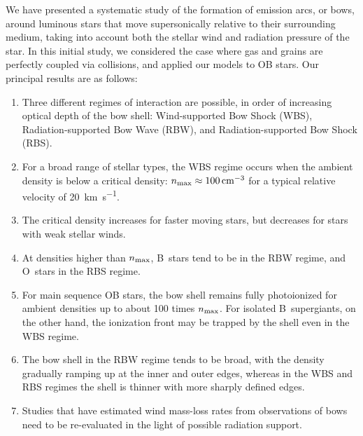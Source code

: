 We have presented a systematic study of the formation of emission
arcs, or bows, around luminous stars that move supersonically relative
to their surrounding medium, taking into account both the stellar wind
and radiation pressure of the star.  In this initial study, we
considered the case where gas and grains are perfectly coupled via
collisions, and applied our models to OB stars.  Our principal results
are as follows:
\begin{enumerate}[1.]
\item Three different regimes of interaction are possible, in order of
  increasing optical depth of the bow shell: Wind-supported Bow Shock
  (WBS), Radiation-supported Bow Wave (RBW), and Radiation-supported
  Bow Shock (RBS).
\item For a broad range of stellar types, the WBS regime occurs when
  the ambient density is below a critical density:
  \(n_{\text{max}} \approx \SI{100}{cm^{-3}}\) for a typical relative velocity of
  \SI{20}{km.s^{-1}}.
\item The critical density increases for faster moving stars, but
  decreases for stars with weak stellar winds.
\item At densities higher than \(n_{\text{max}}\), B~stars tend to be in the
  RBW regime, and O~stars in the RBS regime.
\item For main sequence OB stars, the bow shell remains fully
  photoionized for ambient densities up to about 100 times
  \(n_{\text{max}}\). For isolated B~supergiants, on the other hand, the
  ionization front may be trapped by the shell even in the WBS regime.
\item The bow shell in the RBW regime tends to be broad, with the
  density gradually ramping up at the inner and outer edges, whereas
  in the WBS and RBS regimes the shell is thinner with more sharply
  defined edges.
\item Studies that have estimated wind mass-loss rates from
  observations of bows need to be re-evaluated in the light of
  possible radiation support. 
\end{enumerate}



